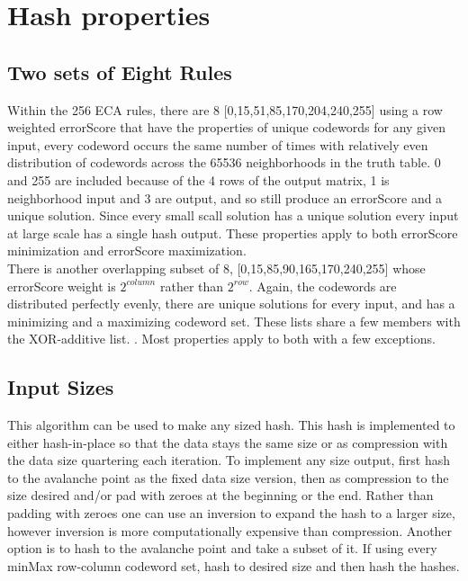 \documentclass[11pt]{article}
\begin{document}
\section{Hash properties}

\subsection{Two sets of Eight Rules}
Within the 256 ECA rules, there are 8 [0,15,51,85,170,204,240,255] using a row weighted errorScore that have the properties of unique codewords for any given input, every codeword occurs the same number of times with relatively even distribution of codewords across the 65536 neighborhoods in the truth table. 0 and 255 are included because of the 4 rows of the output matrix, 1 is neighborhood input and 3 are output, and so still produce an errorScore and a unique solution. Since every small scall solution has a unique solution every input at large scale has a single hash output. These properties apply to both errorScore minimization and errorScore maximization. \\

There is another overlapping subset of 8, [0,15,85,90,165,170,240,255] whose errorScore weight is $2^{column}$ rather than $2^{row}$. Again, the codewords are distributed perfectly evenly, there are unique solutions for every input, and has a minimizing and a maximizing codeword set. These lists share a few members with the XOR-additive list. \cite{xorAdditive}. Most properties apply to both with a few exceptions.\\

\subsection{Input Sizes}
This algorithm can be used to make any sized hash. This hash is implemented to either hash-in-place so that the data stays the same size or as compression with the data size quartering each iteration. To implement any size output, first hash to the avalanche point as the fixed data size version, then as compression to the size desired and/or pad with zeroes at the beginning or the end. Rather than padding with zeroes one can use an inversion to expand the hash to a larger size, however inversion is more computationally expensive than compression. Another option is to hash to the avalanche point and take a subset of it. If using every minMax row-column codeword set, hash to desired size and then hash the hashes.\\
\end{document}
